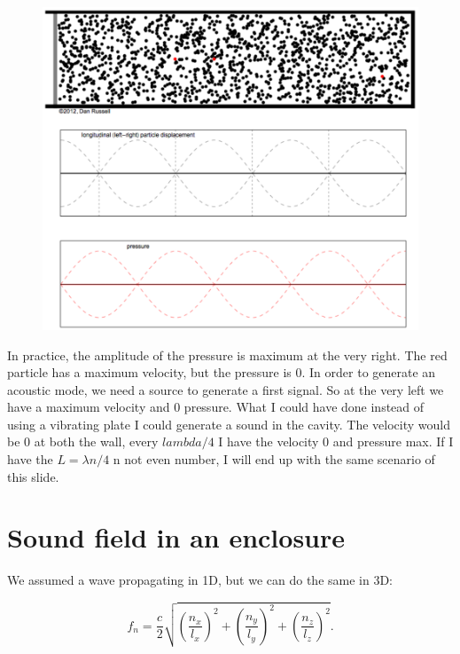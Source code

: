 	\begin{figure}
	\vspace{-5mm}
	\includegraphics[scale=0.2]{acoustics/ch4/7}
	\label{fig:4.7}
	\end{figure}
	In practice, the amplitude of the pressure is maximum at the very right. The red particle has a maximum velocity, but the pressure is 0. In order to generate an acoustic mode, we need a source to generate a first signal. So at the very left we have a maximum velocity and 0 pressure. What I could have done instead of using a vibrating plate I could generate a sound in the cavity. The velocity would be 0 at both the wall, every $lambda/4$ I have the velocity 0 and pressure max. If I have the $L= \lambda n / 4$ n not even number, I will end up with the same scenario of this slide.
	
\section{Sound field in an enclosure}
	We assumed a wave propagating in 1D, but we can do the same in 3D: 
	
	\begin{equation}
	f_n = \frac{c}{2} \sqrt{\left(\frac{n_x}{l_x}\right)^2+ \left(\frac{n_y}{l_y}\right)^2 + \left(\frac{n_z}{l_z}\right)^2}.
	\end{equation}		
	
